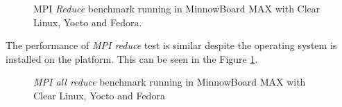 \begin{figure}[H]
\begin{center}
\end{center}
\caption{MPI \textit{Reduce} benchmark running in MinnowBoard MAX with Clear Linux, Yocto
and Fedora.}
\label{mpi_reduce_yocto}
\end{figure}

The performance of \textit{MPI reduce} test is similar despite the operating
system is installed on the platform. This can be seen in the Figure
\ref{mpi_reduce_yocto}.

\begin{figure}[H]
\begin{center}
\end{center}
\caption{\textit{MPI all reduce} benchmark running in  MinnowBoard MAX with Clear Linux,
Yocto and Fedora}
\label{mpi_allreduce_yocto}
\end{figure}


